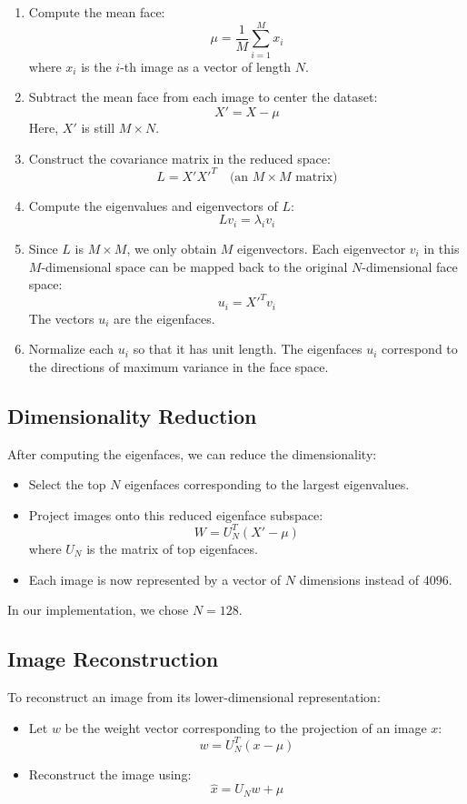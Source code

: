 \documentclass[a4paper, 12pt]{article}
\begin{document}
\begin{enumerate}
    \item Compute the mean face:
    \[
    \mu = \frac{1}{M}\sum_{i=1}^{M} x_i
    \]
    where $x_i$ is the $i$-th image as a vector of length $N$.
    
    \item Subtract the mean face from each image to center the dataset:
    \[
    X' = X - \mu
    \]
    Here, $X'$ is still $M \times N$.
    
    \item Construct the covariance matrix in the reduced space:
    \[
    L = X' X'^T \quad \text{(an } M \times M \text{ matrix)}
    \]

    \item Compute the eigenvalues and eigenvectors of $L$:
    \[
    L v_i = \lambda_i v_i
    \]

    \item Since $L$ is $M \times M$, we only obtain $M$ eigenvectors. Each eigenvector $v_i$ in this $M$-dimensional space can be mapped back to the original $N$-dimensional face space:
    \[
    u_i = X'^T v_i
    \]
    The vectors $u_i$ are the eigenfaces.

    \item Normalize each $u_i$ so that it has unit length. The eigenfaces $u_i$ correspond to the directions of maximum variance in the face space.
\end{enumerate}

\subsection*{Dimensionality Reduction}
After computing the eigenfaces, we can reduce the dimensionality:
\begin{itemize}
    \item Select the top $N$ eigenfaces corresponding to the largest eigenvalues.
    \item Project images onto this reduced eigenface subspace:
    \[
    W = U_{N}^T (X' - \mu)
    \]
    where $U_{N}$ is the matrix of top eigenfaces.
    
    \item Each image is now represented by a vector of $N$ dimensions instead of $4096$.
\end{itemize}

In our implementation, we chose $N = 128$.

\subsection*{Image Reconstruction}
To reconstruct an image from its lower-dimensional representation:
\begin{itemize}
    \item Let $w$ be the weight vector corresponding to the projection of an image $x$:
    \[
    w = U_{N}^T(x - \mu)
    \]

    \item Reconstruct the image using:
    \[
    \hat{x} = U_{N} w + \mu
    \]
\end{itemize}
\end{document}
